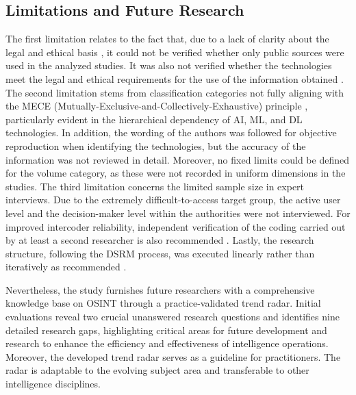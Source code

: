 \documentclass[10pt]{article}
\begin{document}

\subsection{Limitations and Future Research}

The first limitation relates to the fact that, due to a lack of clarity about the legal
and ethical basis \cite{Ghioni.2023,Wittmer.2022},
it could not be verified whether only public sources \cite{NorthAtlanticTreatyOrganization.2002} were used
in the analyzed studies. It was also not verified whether the technologies meet the
legal and ethical requirements for the use of the information obtained
\cite{PastorGalindo.2020,Wittmer.2022}. The second
limitation stems from classification categories not fully aligning with the
MECE (Mutually-Exclusive-and-Collectively-Exhaustive) principle \cite{Lee.2018},
particularly evident in the hierarchical dependency of AI, ML, and DL technologies. In addition,
the wording of the authors was followed for objective reproduction when identifying the technologies,
but the accuracy of the information was not reviewed in detail. Moreover, no fixed limits could be defined
for the volume category, as these were not recorded in uniform dimensions in the studies.
The third limitation concerns the limited sample size in expert interviews. Due to the
extremely difficult-to-access target group, the active user level and the decision-maker
level within the authorities were not interviewed. For improved intercoder reliability,
independent verification of the coding carried out by at least a second researcher
is also recommended \cite{Bogner.2002c,Glaser.2009}.
Lastly, the research structure, following the DSRM process, was executed linearly rather
than iteratively as recommended \cite{Peffers.2007}.

Nevertheless, the study furnishes future researchers with a comprehensive knowledge base on OSINT
through a practice-validated trend radar.
Initial evaluations reveal two crucial unanswered research questions and identifies nine detailed research gaps, highlighting
critical areas for future development and research to enhance the efficiency and effectiveness of intelligence operations.
Moreover, the developed trend radar serves as a guideline for practitioners. The radar
is adaptable to the evolving subject area and transferable to other intelligence disciplines.
\end{document}
